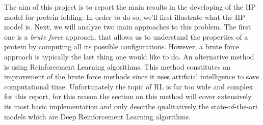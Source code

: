 The aim of this project is to report the main results in the developing of the HP model for protein folding.
In order to do so, we'll first illustrate what the HP model is.
Next, we will analyze two main approaches to this problem.
The first one is a \emph{brute force} approach, that allows us to understand the properties of a protein by computing all its possible configurations.
However, a brute force approach is typically the last thing one would like to do.
An alternative method is using Reinforcement Learning algorithms.
This method constitutes an improvement of the brute force methods since it uses artificial intelligence to save computational time. 
Unfortunately the topic of RL is far too wide and complex for this report, for this reason the section on this method will cover extensively its most basic implementation and only describe qualitatively the state-of-the-art models which are Deep Reinforcement Learning algorithms.
